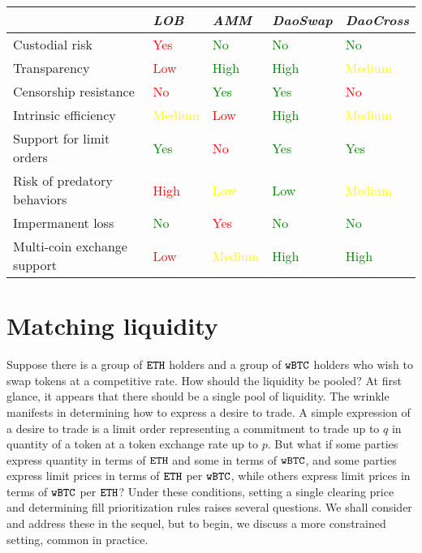 \documentclass[11pt, reqno]{amsart}
\theoremstyle{definition}
\theoremstyle{remark}
\newcommand{\BTC}{\textnormal{\texttt{wBTC}}}
\newcommand{\ETH}{\textnormal{\texttt{ETH}}}
\begin{document}
\begin{samepage}
	\begin{table}[h!]
		\centering
		\begin{tabular}{lllll}
			                            & \emph{LOB} & \emph{AMM} & \emph{DaoSwap} & \emph{DaoCross} \\
			\hline
            Custodial risk              & \textcolor{red}{Yes}        & \textcolor{green}{No} & \textcolor{green}{No} & \textcolor{green}{No}  \\
            Transparency                & \textcolor{red}{Low}        & \textcolor{green}{High}       & \textcolor{green}{High}           & \textcolor{yellow}{Medium} \\
            Censorship resistance       & \textcolor{red}{No}         & \textcolor{green}{Yes} & \textcolor{green}{Yes} & \textcolor{red}{No} \\
            Intrinsic efficiency        & \textcolor{yellow}{Medium}     & \textcolor{red}{Low}        & \textcolor{green}{High} & \textcolor{yellow}{Medium}          \\
            Support for limit orders    & \textcolor{green}{Yes} & \textcolor{red}{No} & \textcolor{green}{Yes}            & \textcolor{green}{Yes} \\
            Risk of predatory behaviors & \textcolor{red}{High} & \textcolor{yellow}{Low} & \textcolor{green}{Low}       & \textcolor{yellow}{Medium} \\
            Impermanent loss            & \textcolor{green}{No}         & \textcolor{red}{Yes} & \textcolor{green}{No}             & \textcolor{green}{No}              \\
            Multi-coin exchange support & \textcolor{red}{Low} & \textcolor{yellow}{Medium} & \textcolor{green}{High} & \textcolor{green}{High} \\
			\hline
		\end{tabular}
	\end{table}
\end{samepage}

\section{Matching liquidity}
Suppose there is a group of $\ETH$ holders and a group of $\BTC$ holders who
wish to swap tokens at a competitive rate.
How should the liquidity be pooled? At first glance, it appears that
there should be a single pool of liquidity. The wrinkle manifests in determining
how to express a desire to trade. A simple expression of a desire to trade is
a limit order representing a commitment to trade up to $q$ in quantity of
a token at a token exchange rate up to $p$. But what if some parties express
quantity in terms of $\ETH$ and some in terms of $\BTC$, and some parties
express limit prices in terms of $\ETH$ per $\BTC$, while others express limit
prices in terms of $\BTC$ per $\ETH$? Under these conditions, setting a single
clearing price and determining fill prioritization rules raises several
questions. We shall consider and address these in the sequel, but to begin, we
discuss a more constrained setting, common in practice.
\end{document}
